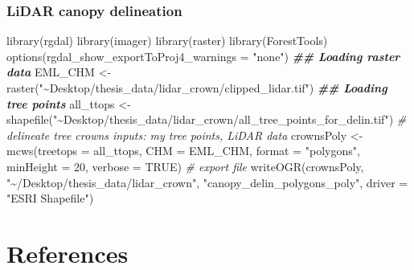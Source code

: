 \documentclass[12pt,twoside]{reedthesis}
\newenvironment{Shaded}{\begin{snugshade}}{\end{snugshade}}
\newcommand{\AttributeTok}[1]{\textcolor[rgb]{0.77,0.63,0.00}{#1}}
\newcommand{\CommentTok}[1]{\textcolor[rgb]{0.56,0.35,0.01}{\textit{#1}}}
\newcommand{\ConstantTok}[1]{\textcolor[rgb]{0.00,0.00,0.00}{#1}}
\newcommand{\DecValTok}[1]{\textcolor[rgb]{0.00,0.00,0.81}{#1}}
\newcommand{\DocumentationTok}[1]{\textcolor[rgb]{0.56,0.35,0.01}{\textbf{\textit{#1}}}}
\newcommand{\FunctionTok}[1]{\textcolor[rgb]{0.00,0.00,0.00}{#1}}
\newcommand{\NormalTok}[1]{#1}
\newcommand{\OtherTok}[1]{\textcolor[rgb]{0.56,0.35,0.01}{#1}}
\newcommand{\StringTok}[1]{\textcolor[rgb]{0.31,0.60,0.02}{#1}}
\begin{document}
\hypertarget{lidar-canopy-delineation}{%
\subsection{LiDAR canopy delineation}\label{lidar-canopy-delineation}}
\begin{Shaded}
\begin{Highlighting}[]
\FunctionTok{library}\NormalTok{(rgdal)}
\FunctionTok{library}\NormalTok{(imager)}
\FunctionTok{library}\NormalTok{(raster)}
\FunctionTok{library}\NormalTok{(ForestTools)}
\FunctionTok{options}\NormalTok{(}\AttributeTok{rgdal\_show\_exportToProj4\_warnings =} \StringTok{"none"}\NormalTok{)}
\DocumentationTok{\#\# Loading raster data}
\NormalTok{EML\_CHM }\OtherTok{\textless{}{-}} \FunctionTok{raster}\NormalTok{(}\StringTok{"\textasciitilde{}Desktop/thesis\_data/lidar\_crown/clipped\_lidar.tif"}\NormalTok{)}
\DocumentationTok{\#\# Loading tree points}
\NormalTok{all\_ttops }\OtherTok{\textless{}{-}} \FunctionTok{shapefile}\NormalTok{(}\StringTok{"\textasciitilde{}Desktop/thesis\_data/lidar\_crown/all\_tree\_points\_for\_delin.tif"}\NormalTok{)}
\CommentTok{\# delineate tree crowns inputs: my tree points, LiDAR data}
\NormalTok{crownsPoly }\OtherTok{\textless{}{-}} \FunctionTok{mcws}\NormalTok{(}\AttributeTok{treetops =}\NormalTok{ all\_ttops, }\AttributeTok{CHM =}\NormalTok{ EML\_CHM, }\AttributeTok{format =} \StringTok{"polygons"}\NormalTok{,}
    \AttributeTok{minHeight =} \DecValTok{20}\NormalTok{, }\AttributeTok{verbose =} \ConstantTok{TRUE}\NormalTok{)}
\CommentTok{\# export file}
\FunctionTok{writeOGR}\NormalTok{(crownsPoly, }\StringTok{"\textasciitilde{}/Desktop/thesis\_data/lidar\_crown"}\NormalTok{, }\StringTok{"canopy\_delin\_polygons\_poly"}\NormalTok{,}
    \AttributeTok{driver =} \StringTok{"ESRI Shapefile"}\NormalTok{)}
\end{Highlighting}
\end{Shaded}
\backmatter

\hypertarget{references}{%
\chapter*{References}\label{references}}


\noindent

\setlength{\parindent}{-0.20in}
\end{document}
